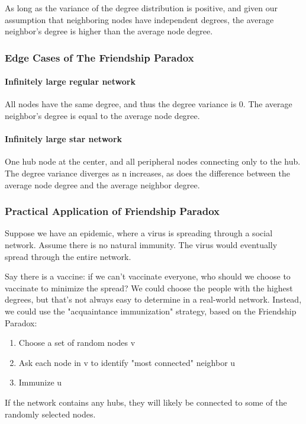 \documentclass[11pt]{scrartcl} %
\begin{document}
As long as the variance of the degree distribution is positive, and given our assumption that neighboring nodes have independent degrees, the average neighbor's degree is higher than the average node degree.

\subsubsection{Edge Cases of The Friendship Paradox}
\paragraph{Infinitely large regular network} All nodes have the same degree, and thus the degree variance is 0. The average neighbor's degree is equal to the average node degree.

\paragraph{Infinitely large star network} One hub node at the center, and all peripheral nodes connecting only to the hub. The degree variance diverges as n increases, as does the difference between the average node degree and the average neighbor degree.

\subsubsection{Practical Application of Friendship Paradox}
Suppose we have an epidemic, where a virus is spreading through a social network. Assume there is no natural immunity.  The virus would eventually spread through the entire network. 

Say there is a vaccine: if we can't vaccinate everyone, who should we choose to vaccinate to minimize the spread? We could choose the people with the highest degrees, but that's not always easy to determine in a real-world network. Instead, we could use the "acquaintance immunization" strategy, based on the Friendship Paradox:
\begin{enumerate}
	\item Choose a set of random nodes v
	\item Ask each node in v to identify "most connected" neighbor u
	\item Immunize u
\end{enumerate}

If the network contains any hubs, they will likely be connected to some of the randomly selected nodes.
\end{document}

